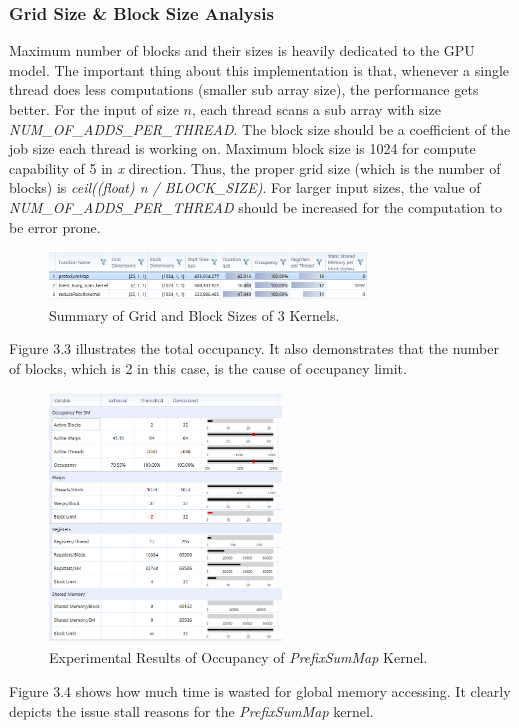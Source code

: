 \documentclass[12pt]{article}
\numberwithin{equation}{section}
\numberwithin{table}{section}
\numberwithin{figure}{section}
\begin{document}
\subsubsection{Grid Size \& Block Size Analysis}
Maximum number of blocks and their sizes is heavily dedicated to the GPU model. The important thing about this implementation is that, whenever a single thread does less computations (smaller sub array size), the performance gets better. For the input of size $n$, each thread scans a sub array with size \textit{NUM\_OF\_ADDS\_PER\_THREAD}. The block size should be a coefficient of the job size each thread is working on. Maximum block size is 1024 for compute capability of 5 in \textit{x} direction. Thus, the proper grid size (which is the number of blocks) is \textit{ceil((float) n / BLOCK\_SIZE)}. For larger input sizes, the value of \textit{NUM\_OF\_ADDS\_PER\_THREAD} should be increased for the computation to be error prone.
\begin{figure}[!h]\centering
	\includegraphics[width=0.75\textwidth]{3_1.png}
	\caption{Summary of Grid and Block Sizes of 3 Kernels.}
	\label{pl1}
\end{figure}
Figure 3.3 illustrates the total occupancy. It also demonstrates that the number of blocks, which is 2 in this case, is the cause of occupancy limit.
\begin{figure}[!h]\centering
	\includegraphics[width=0.55\textwidth]{3_2.png}
	\caption{Experimental Results of Occupancy of \textit{PrefixSumMap} Kernel.}
	\label{pl1}
\end{figure}
\newpage
Figure 3.4 shows how much time is wasted for global memory accessing. It clearly depicts the issue stall reasons for the \textit{PrefixSumMap} kernel.
\end{document}
